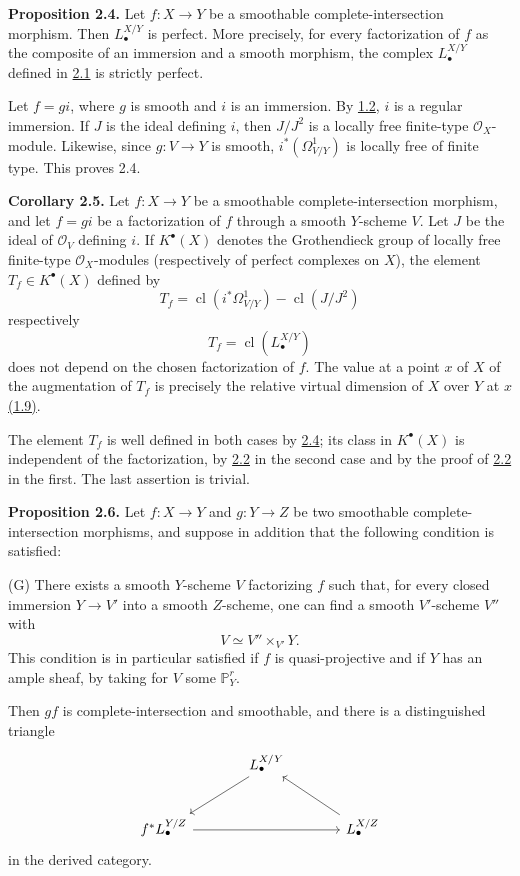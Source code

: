 \textbf{Proposition 2.4.} Let $f:X\to Y$ be a smoothable complete-intersection morphism. Then $L^{X/Y}_\bullet$ is perfect. More precisely, for every factorization of $f$ as the composite of an immersion and a smooth morphism, the complex $L^{X/Y}_\bullet$ defined in \hyperlink{sga6.e08.para.2-1}{2.1} is strictly perfect.

Let $f=g i$, where $g$ is smooth and $i$ is an immersion. By \hyperlink{sga6.e08.prop.1-2}{1.2}, $i$ is a regular immersion. If $J$ is the ideal defining $i$, then $J/J^2$ is a locally free finite-type $\mathcal O_X$-module. Likewise, since $g:V\to Y$ is smooth, $i^*(\Omega^1_{V/Y})$ is locally free of finite type. This proves 2.4.

\textbf{Corollary 2.5.} Let $f:X\to Y$ be a smoothable complete-intersection morphism, and let $f=gi$ be a factorization of $f$ through a smooth $Y$-scheme $V$. Let $J$ be the ideal of $\mathcal O_V$ defining $i$. If $K^{\bullet}(X)$ denotes the Grothendieck group of locally free finite-type $\mathcal O_X$-modules (respectively of perfect complexes on $X$), the element $T_f\in K^{\bullet}(X)$ defined by
\[
T_f=\operatorname{cl}(i^*\Omega^1_{V/Y})-\operatorname{cl}(J/J^2)
\]
respectively
\[
T_f=\operatorname{cl}(L^{X/Y}_\bullet)
\]
does not depend on the chosen factorization of $f$. The value at a point $x$ of $X$ of the augmentation of $T_f$ is precisely the relative virtual dimension of $X$ over $Y$ at $x$ \hyperlink{sga6.e08.def.1-9}{(1.9)}.

The element $T_f$ is well defined in both cases by \hyperlink{sga6.e08.prop.2-4}{2.4}; its class in $K^{\bullet}(X)$ is independent of the factorization, by \hyperlink{sga6.e08.prop.2-2}{2.2} in the second case and by the proof of \hyperlink{sga6.e08.prop.2-2}{2.2} in the first. The last assertion is trivial.

\textbf{Proposition 2.6.} Let $f:X\to Y$ and $g:Y\to Z$ be two smoothable complete-intersection morphisms, and suppose in addition that the following condition is satisfied:

(G) There exists a smooth $Y$-scheme $V$ factorizing $f$ such that, for every closed immersion $Y\to V'$ into a smooth $Z$-scheme, one can find a smooth $V'$-scheme $V''$ with
\[
V \simeq V''\times_{V'}Y.
\]
This condition is in particular satisfied if $f$ is quasi-projective and if $Y$ has an ample sheaf, by taking for $V$ some $\mathbb P^r_Y$.

Then $gf$ is complete-intersection and smoothable, and there is a distinguished triangle
\[
\begin{tikzcd}[column sep=large,row sep=large]
& L^{X/Y}_\bullet \arrow[dl] \\
f^*L^{Y/Z}_\bullet \arrow[rr] && L^{X/Z}_\bullet \arrow[ul]
\end{tikzcd}
\]
in the derived category.


